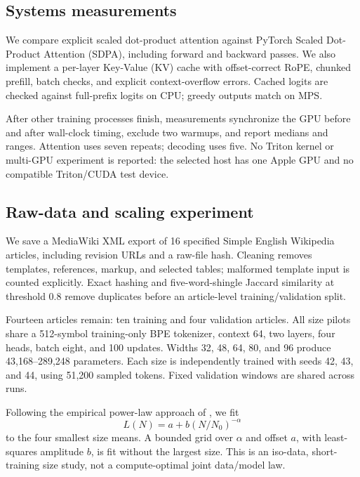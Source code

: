 \documentclass{article}
\begin{document}
\subsection{Systems measurements}

We compare explicit scaled dot-product attention against PyTorch Scaled
Dot-Product Attention (SDPA), including forward and backward passes.
We also implement a per-layer Key-Value (KV) cache with offset-correct
RoPE, chunked prefill, batch checks, and explicit context-overflow errors.
Cached logits are checked against full-prefix logits on CPU;
greedy outputs match on MPS.

After other training processes finish, measurements synchronize the GPU
before and after wall-clock timing, exclude two warmups, and report
medians and ranges. Attention uses seven repeats; decoding uses five.
No Triton kernel or multi-GPU experiment is reported: the selected host
has one Apple GPU and no compatible Triton/CUDA test device.

\subsection{Raw-data and scaling experiment}

We save a MediaWiki XML export of 16 specified Simple English
Wikipedia articles, including revision URLs and a raw-file hash.
Cleaning removes templates, references, markup, and selected tables;
malformed template input is counted explicitly. Exact hashing and
five-word-shingle Jaccard similarity at threshold 0.8 remove duplicates
before an article-level training/validation split.

Fourteen articles remain: ten training and four validation articles.
All size pilots share a 512-symbol training-only BPE tokenizer, context
64, two layers, four heads, batch eight, and 100 updates.
Widths 32, 48, 64, 80, and 96 produce 43,168--289,248 parameters.
Each size is independently trained with seeds 42, 43, and 44, using
51,200 sampled tokens. Fixed validation windows are shared across runs.

Following the empirical power-law approach of \citet{kaplan}, we fit
\begin{equation}
 L(N)=a+b(N/N_0)^{-\alpha}
\end{equation}
to the four smallest size means. A bounded grid over $\alpha$ and
offset $a$, with least-squares amplitude $b$, is fit without the largest
size. This is an iso-data, short-training size study, not a
compute-optimal joint data/model law.
\end{document}
